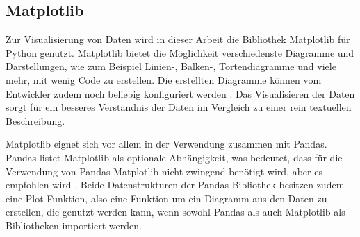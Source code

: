 \subsection{Matplotlib}
Zur Visualisierung von Daten wird in dieser Arbeit die Bibliothek Matplotlib für Python genutzt. Matplotlib bietet die Möglichkeit verschiedenste Diagramme und Darstellungen,
wie zum Beispiel Linien-, Balken-, Tortendiagramme und viele mehr, mit wenig Code zu erstellen. Die erstellten Diagramme können vom Entwickler zudem noch beliebig 
konfiguriert werden \cite[vgl. S.167.]{NumerischesPython}. Das Visualisieren der Daten sorgt für ein besseres Verständnis der Daten im Vergleich zu einer rein textuellen Beschreibung.

Matplotlib eignet sich vor allem in der Verwendung zusammen mit Pandas. Pandas listet Matplotlib als \glqq optionale Abhängigkeit\grqq{}, was bedeutet, dass für die Verwendung
von Pandas Matplotlib nicht zwingend benötigt wird, aber es empfohlen wird \cite[vgl. S.253]{NumerischesPython}.
Beide Datenstrukturen der Pandas-Bibliothek besitzen zudem eine Plot-Funktion, also eine Funktion um ein Diagramm aus den Daten zu erstellen, 
die genutzt werden kann, wenn sowohl Pandas als auch Matplotlib als Bibliotheken importiert werden.